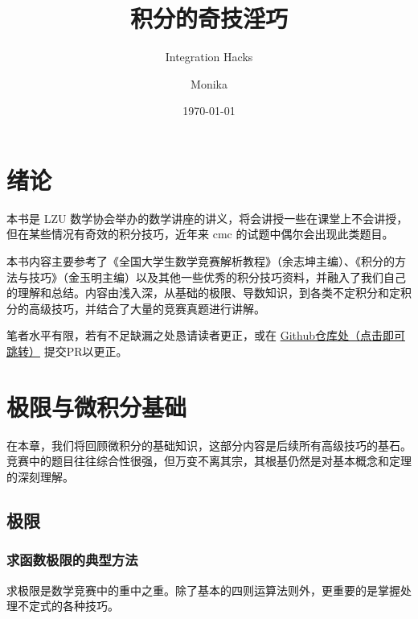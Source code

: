 \documentclass[lang=cn,newtx,10pt,scheme=chinese]{elegantbook}
\title{积分的奇技淫巧}
\subtitle{Integration Hacks}
\author{Monika}
\date{\today}
\begin{document}
\maketitle
\frontmatter

\tableofcontents

\chapter{绪论}
本书是 LZU 数学协会举办的数学讲座的讲义，将会讲授一些在课堂上不会讲授，但在某些情况有奇效的积分技巧，近年来 cmc 的试题中偶尔会出现此类题目。

本书内容主要参考了《全国大学生数学竞赛解析教程》（余志坤主编）、《积分的方法与技巧》（金玉明主编）以及其他一些优秀的积分技巧资料，并融入了我们自己的理解和总结。内容由浅入深，从基础的极限、导数知识，到各类不定积分和定积分的高级技巧，并结合了大量的竞赛真题进行讲解。

笔者水平有限，若有不足缺漏之处恳请读者更正，或在 \href{https://github.com/Monika-shipship/MonikaMathLecture}{Github仓库处（点击即可跳转）} 提交PR以更正。
\mainmatter

\chapter{极限与微积分基础}
在本章，我们将回顾微积分的基础知识，这部分内容是后续所有高级技巧的基石。竞赛中的题目往往综合性很强，但万变不离其宗，其根基仍然是对基本概念和定理的深刻理解。

\section{极限}
\subsection{求函数极限的典型方法}
求极限是数学竞赛中的重中之重。除了基本的四则运算法则外，更重要的是掌握处理不定式的各种技巧。
\end{document}
